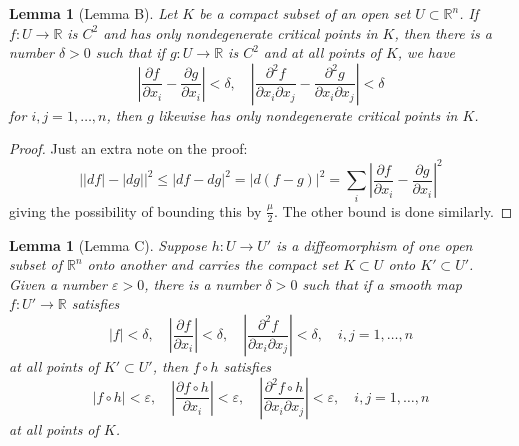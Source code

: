 \documentclass[reqno]{amsart}
\newtheorem{lemma}[theorem]{Lemma}
\theoremstyle{definition}
\theoremstyle{remark}
\begin{document}
   \begin{lemma}[Lemma B]
       Let $K$ be a compact subset of an
       open set $U \subset \mathbb{R}^{n}$. If
       $f \colon U \to \mathbb{R}$ is  $C^2$ and
       has only nondegenerate critical points in
       $K$, then there is a number $\delta >0$ such that
       if $g \colon U \to \mathbb{R}$ is $C^2$ and at
       all points of $K$, we have
        \[
       \left| \frac{\partial f}{\partial x_i} -
       \frac{\partial g}{\partial x_i} \right| < \delta,
       \quad
       \left| \frac{\partial^2 f}{\partial x_i \partial x_j}
       - \frac{\partial^2 g}{\partial x_i \partial x_j}\right| <
       \delta 
       \] 
       for $i,j = 1,\ldots, n$, then
       $g$ likewise has only nondegenerate critical points
       in $K$.
   \end{lemma}

   \begin{proof}
       Just an extra note on the proof: 
       \[
       \left| \left| df \right| -
       \left| dg \right| \right|^2
       \le \left| df - dg \right|^2
       = \left| d(f-g) \right|^2
       = \sum_i \left|   \frac{\partial f}{\partial x_i}
       - \frac{\partial g}{\partial x_i}\right|^2
       \] 
       giving the possibility of bounding
       this by $\frac{\mu}{2}$.
       The other bound is done similarly.
   \end{proof}
        
   \begin{lemma}[Lemma C]
       Suppose $h \colon U \to U'$ is a diffeomorphism
       of one open subset of $\mathbb{R}^{n}$ onto
       another and carries the compact set
       $K \subset U$ onto $K' \subset U'$. Given
       a number $\varepsilon > 0$, there is a number
       $\delta > 0$ such that if a smooth map
       $f \colon U' \to \mathbb{R}$ satisfies
       \[
       \left| f \right| < \delta, \quad
       \left| \frac{\partial f}{\partial x_i} \right| <
       \delta,
       \quad
       \left| \frac{\partial^2 f}{\partial x_i \partial
       x_j} \right| < \delta,
       \quad i, j = 1,\ldots,n
       \] 
       at all points of $K' \subset U'$, then
       $f \circ h$ satisfies
       \[
       \left| f \circ h \right| <
       \varepsilon, \quad
       \left| \frac{\partial f \circ h}{\partial x_i} \right| 
       < \varepsilon,
       \quad
       \left| \frac{\partial^2 f \circ h}{\partial x_i
       \partial x_j} \right| < \varepsilon,
       \quad
       i , j = 1,\ldots, n
       \] 
       at all points of $K$.
   \end{lemma}
\end{document}
